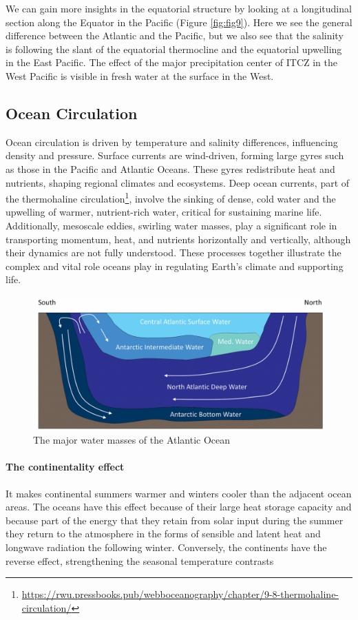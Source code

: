 We can gain more insights in the equatorial structure by looking at a
longitudinal section along the Equator in the Pacific (Figure \ref{fig:fig9}). Here we see the general difference between the
Atlantic and the Pacific, but we also see that the salinity is following
the slant of the equatorial thermocline and the equatorial upwelling in
the East Pacific. The effect of the major precipitation center of ITCZ
in the West Pacific is visible in fresh water at the surface in the
West.

\subsection{Ocean Circulation}
Ocean circulation is driven by temperature and salinity differences, influencing density and pressure. Surface currents are wind-driven, forming large gyres such as those in the Pacific and Atlantic Oceans. These gyres redistribute heat and nutrients, shaping regional climates and ecosystems. Deep ocean currents, part of the thermohaline circulation\footnote{\url{https://rwu.pressbooks.pub/webboceanography/chapter/9-8-thermohaline-circulation/}}, involve the sinking of dense, cold water and the upwelling of warmer, nutrient-rich water, critical for sustaining marine life.
Additionally, mesoscale eddies, swirling water masses, play a significant role in transporting momentum, heat, and nutrients horizontally and vertically, although their dynamics are not fully understood. These processes together illustrate the complex and vital role oceans play in regulating Earth's climate and supporting life.
\begin{figure}[htbp]
    \centering
    \includegraphics[width=0.5\linewidth]{uploads/atlocean.png}
    \caption{The major water masses of the Atlantic Ocean}
    \label{fig:enter-label}
\end{figure}

\paragraph{The continentality effect}
It makes continental summers warmer and winters cooler than the adjacent ocean areas. The oceans have this effect because of their large heat storage capacity and because part of  the energy that they retain from solar input during the summer they return to the atmosphere in the forms of sensible and latent heat and longwave radiation the following winter. Conversely, the continents have the reverse effect, strengthening the seasonal temperature contrasts 

